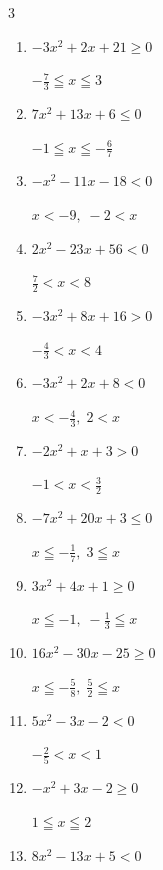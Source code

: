 \begin{multicols}{3}
\begin{enumerate}
        $\displaystyle -\frac{9}{7} < x < -\frac{8}{7}$

  \item $-3x^{2}+2x+21\geq 0$

        $\displaystyle -\frac{7}{3} \leqq x \leqq 3$

  \item $7x^{2}+13x+6\leq 0$

        $\displaystyle -1 \leqq x \leqq -\frac{6}{7}$

  \item $-x^{2}-11x-18<0$

        $\displaystyle x < -9 , \; -2 < x$

  \item $2x^{2}-23x+56<0$

        $\displaystyle \frac{7}{2} < x < 8$

  \item $-3x^{2}+8x+16>0$

        $\displaystyle -\frac{4}{3} < x < 4$

\columnbreak %

  \item $-3x^{2}+2x+8<0$

        $\displaystyle x < -\frac{4}{3} , \; 2 < x$

  \item $-2x^{2}+x+3>0$

        $\displaystyle -1 < x < \frac{3}{2}$

  \item $-7x^{2}+20x+3\leq 0$

        $\displaystyle x \leqq -\frac{1}{7} , \; 3 \leqq x$

  \item $3x^{2}+4x+1\geq 0$

        $\displaystyle x \leqq -1 , \; -\frac{1}{3} \leqq x$

  \item $16x^{2}-30x-25\geq 0$

        $\displaystyle x \leqq -\frac{5}{8} , \; \frac{5}{2} \leqq x$

  \item $5x^{2}-3x-2<0$

        $\displaystyle -\frac{2}{5} < x < 1$

  \item $-x^{2}+3x-2\geq 0$

        $\displaystyle 1 \leqq x \leqq 2$

  \item $8x^{2}-13x+5<0$


\end{enumerate}
\end{multicols}
